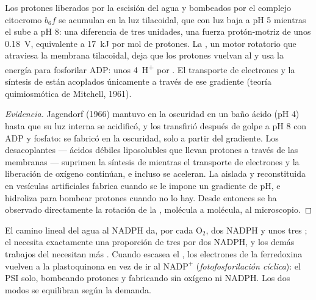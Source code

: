 \begin{theorem}\label{thm:b1:photosynthesis:chemiosmosis}
Los protones liberados por la escisión del agua y bombeados por el complejo
citocromo $b_6f$ se acumulan en la luz tilacoidal, que con luz baja a pH 5
mientras el  sube a pH 8: una diferencia de tres unidades, una fuerza
protón-motriz de unos \qty{0.18}{V}, equivalente a \qty{17}{kJ} por mol de
protones. La \emph{}, un motor rotatorio que atraviesa la
membrana tilacoidal, deja que los protones vuelvan al  y usa la
energía para fosforilar ADP: unos \qty{4}{H^+} por . El transporte de
electrones y la síntesis de  están acoplados únicamente a través de ese
gradiente (teoría quimiosmótica de Mitchell, 1961).
\end{theorem}
\begin{proof}[Evidencia]
Jagendorf (1966) mantuvo  en la oscuridad en un baño ácido (pH 4)
hasta que su luz interna se acidificó, y los transfirió después de golpe a
pH 8 con ADP y fosfato: se fabricó  en la oscuridad, solo a partir del
gradiente. Los desacoplantes --- ácidos débiles liposolubles que llevan
protones a través de las membranas --- suprimen la síntesis de  mientras
el transporte de electrones y la liberación de oxígeno continúan, e incluso
se aceleran. La  aislada y reconstituida en vesículas
artificiales fabrica  cuando se le impone un gradiente de pH, e hidroliza
 para bombear protones cuando no lo hay. Desde entonces se ha observado
directamente la rotación de la , molécula a molécula, al microscopio.
\end{proof}

\begin{example}\label{ex:b1:photosynthesis:cyclic}
El camino lineal del agua al NADPH da, por cada $\mathrm{O_2}$, dos NADPH y
unos tres ; el  necesita exactamente una proporción de
tres  por dos NADPH, y los demás trabajos del  necesitan más
. Cuando escasea el , los electrones de la ferredoxina vuelven a la
plastoquinona en vez de ir al $\mathrm{NADP^+}$ (\emph{fotofosforilación
cíclica}): el PSI solo, bombeando protones y fabricando  sin oxígeno ni
NADPH. Los dos modos se equilibran según la demanda.
\end{example}

